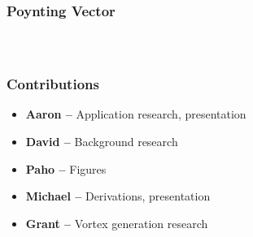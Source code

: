 \documentclass[xcolor=dvipsnames]{beamer}
\newenvironment{items}[1][]
{\begin{itemize}
    \ifthenelse{\isempty{#1}}
    {\setlength{\itemsep}{12pt}}{\setlength{\itemsep}{#1}}}
  {\end{itemize}}
\begin{document}
\begin{frame}
  \frametitle{Poynting Vector}
  \begin{columns}[T,totalwidth=\textwidth]
    \vspace{-.3in}
    \begin{figure}[h]
      \centering

    \end{figure}

    \vspace{-.25in}
    \begin{figure}[h]
      \centering

      \vspace{.2in}
    \end{figure}

  \end{columns}
\end{frame}

\begin{frame}
  \frametitle{Contributions}
  \begin{items}
  \item \textbf{Aaron --} Application research, presentation
  \item \textbf{David --} Background research
  \item \textbf{Paho --} Figures
  \item \textbf{Michael --} Derivations, presentation
  \item \textbf{Grant --} Vortex generation research
  \end{items}
\end{frame}
\end{document}
